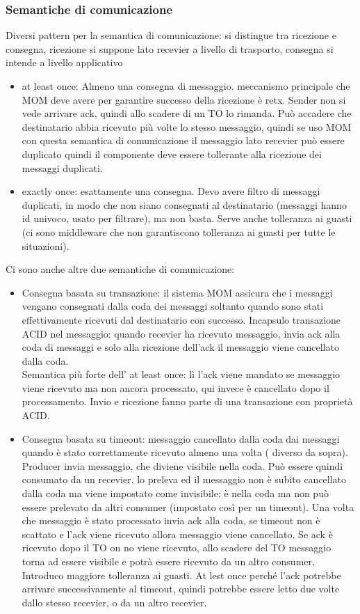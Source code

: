 \documentclass{article}
\begin{document}
\subsubsection{Semantiche di comunicazione}
Diversi pattern per la semantica di comunicazione: si distingue tra ricezione e consegna, ricezione si suppone lato recevier a livello di trasporto, consegna si intende a livello applicativo
\begin{itemize}
\item at least once: Almeno una consegna di messaggio. meccanismo principale che MOM deve avere per garantire successo della ricezione è retx. Sender non si vede arrivare ack, quindi allo scadere di un TO lo rimanda. Può accadere che destinatario abbia ricevuto più volte lo stesso messaggio, quindi se uso MOM con questa semantica di comunicazione il messaggio lato recevier può essere duplicato quindi il componente deve essere tollerante alla ricezione dei messaggi duplicati.
\item exactly once: esattamente una consegna. Devo avere filtro di messaggi duplicati, in modo che non siano consegnati al destinatario (messaggi hanno id univoco, usato per filtrare), ma non basta. Serve anche tolleranza ai guasti (ci sono middleware che non garantiscono tolleranza ai guasti per tutte le situazioni).
\end{itemize}
Ci sono anche altre due semantiche di comunicazione:
\begin{itemize}
\item Consegna basata su transazione: il sistema MOM assicura che i messaggi vengano consegnati dalla coda dei messaggi soltanto quando sono stati effettivamente ricevuti dal destinatario con successo. Incapsulo transazione ACID nel messaggio: quando recevier ha ricevuto messaggio, invia ack alla coda di messaggi e solo alla ricezione dell'ack il messaggio viene cancellato dalla coda.\\ Semantica più forte dell' at least once: lì l'ack viene mandato se messaggio viene ricevuto ma non ancora processato, qui invece è cancellato dopo il processamento. Invio e ricezione fanno parte di una transazione con proprietà ACID.
\item Consegna basata su timeout: messaggio cancellato dalla coda dai messaggi quando è stato correttamente ricevuto almeno una volta ( diverso da sopra). Producer invia messaggio, che diviene visibile nella coda. Può essere quindi consumato da un recevier, lo preleva ed il messaggio non è subito cancellato dalla coda ma viene impostato come invisibile: è nella coda ma non può essere prelevato da altri consumer (impostato così per un timeout). Una volta che messaggio è stato processato invia ack alla coda, se timeout non è scattato e l'ack viene ricevuto allora messaggio viene cancellato. Se ack è ricevuto dopo il TO on no viene ricevuto, allo scadere del TO messaggio torna ad essere visibile e potrà essere ricevuto da un altro consumer. Introduco maggiore tolleranza ai guasti. At lest once perché l'ack potrebbe arrivare successivamente al timeout, quindi potrebbe essere letto due volte dallo stesso recevier, o da un altro recevier.
\end{itemize}
\end{document}
